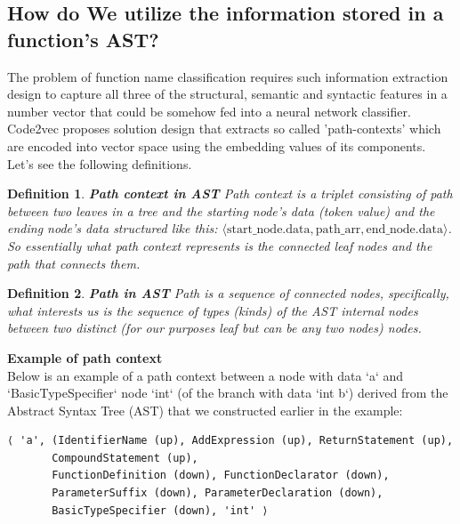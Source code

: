 \documentclass[10pt,english,a4paper]{report}
\newtheorem{definition}{Definition}
\begin{document}
\subsection{How do We utilize the information stored in a function's AST?}
The problem of function name classification requires such information extraction design to capture all three of the structural, semantic and syntactic features in a number vector that could be somehow fed into a neural network classifier. Code2vec \cite{code2vec} proposes solution design that extracts so called 'path-contexts' which are encoded into vector space using the embedding values of its components. Let's see the following definitions.

\begin{definition}
\textbf{Path context in AST}
\cite{bogomolov}
Path context is a triplet consisting of path between two leaves in a tree and the starting node's data (token value) and the ending node's data structured like this: $\langle \text{start\_node.data}, \text{path\_arr}, \text{end\_node.data} \rangle$. So essentially what path context represents is the connected leaf nodes and the path that connects them.
\end{definition}

\begin{definition}
\textbf{Path in AST}
Path is a sequence of connected nodes, specifically, what interests us is the sequence of types (kinds) of the AST internal nodes between two distinct (for our purposes leaf but can be any two nodes) nodes.
\end{definition}

\textbf{Example of path context} \\
\label{path_context_example}
Below is an example of a path context between a node with data `a` and `BasicTypeSpecifier` node `int`
(of the branch with data `int b`) derived from the Abstract Syntax Tree (AST) that we constructed earlier in the example:

\begin{verbatim}
⟨ 'a', (IdentifierName (up), AddExpression (up), ReturnStatement (up),
       CompoundStatement (up),
       FunctionDefinition (down), FunctionDeclarator (down),
       ParameterSuffix (down), ParameterDeclaration (down),
       BasicTypeSpecifier (down), 'int' ⟩
\end{verbatim}
\end{document}
